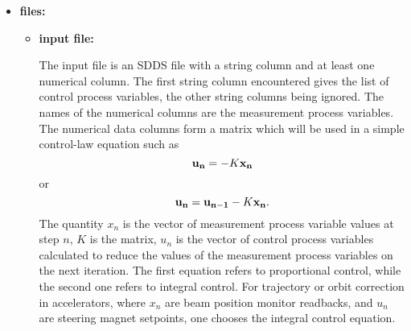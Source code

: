 \begin{itemize}
\begin{verbatim}
       [-readbackLimit={value=<value>|minValue=<value>,maxValue=<value>|file=<filename>}]
       [-actionLimit={value=<value>|file=<filename>}]
       [-testValues=<SDDSfile>] [-statistics=<filename>[,mode=<full|brief>]]
       [-auxiliaryOutput=matrixFile=<file>,controlQuantityDefinition=<file>,
           filterFile=<file>],controlLogFile=<file>[,mode=<integral|proportional>]
       [-runControlPV={string=<string>|parameter=<string>},pingTimeout=<value>
       [-runControlDescription={string=<string>|parameter=<string>}]
       [-launcherPV=<pvname>]
       [-verbose] [-dryRun] [-warning]
       [-servermode=pid=<file>,command=<file>]
       [-controlLogFile=<file>]
       [-glitchLogFile=file=<string>,[readbackRmsThreshold=<value>][,controlRmsThreshold=<value>][,rows=<integer]]
       [-CASecurityTest] [-waveforms=<filename>,<type>] [-postChangeExecution=<string>]

Perform simple feedback on APS control system process variables using ca calls.
\end{verbatim}
\item {\bf files:}
\begin{itemize}
\item {\bf input file:} \par
The input file is an SDDS file with a string column and at least one numerical column. 
The first string column encountered gives the list of 
control process variables, the other string columns being ignored.
The names of the numerical columns are the measurement process variables. 
The numerical data columns form a matrix which will be used in a simple
control-law equation such as
\begin{equation}
{\bf u_n} = - K {\bf x_n}
\end{equation}
or
\begin{equation}
{\bf u_n} = {\bf u_{n-1}} - K {\bf x_n}.
\end{equation}
The quantity $x_n$ is the vector of measurement process variable
values at step $n$, $K$ is the matrix, $u_n$ is the vector of control
process variables calculated to reduce the values of the measurement
process variables on the next iteration.  The first equation refers to
proportional control, while the second one refers to integral
control. For trajectory or orbit correction in accelerators, where
$x_n$ are beam position monitor readbacks, and $u_n$ are steering
magnet setpoints, one chooses the integral control equation.


\end{itemize}
\end{itemize}
